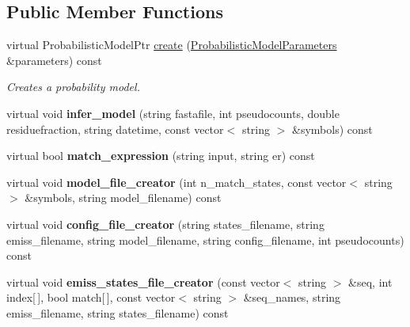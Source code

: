 \subsection*{Public Member Functions}
\begin{DoxyCompactItemize}
\item 
virtual Probabilistic\+Model\+Ptr \hyperlink{classtops_1_1TrainProfileHMMMaxLikelihood_ad73c7f1ec96af19a08186cfec7a141e7}{create} (\hyperlink{classtops_1_1ProbabilisticModelParameters}{Probabilistic\+Model\+Parameters} \&parameters) const
\begin{DoxyCompactList}\small\item\em Creates a probability model. \end{DoxyCompactList}\item 
\mbox{\label{classtops_1_1TrainProfileHMMMaxLikelihood_a00146cd905b59b1a260227dfaf64829f}} 
virtual void {\bfseries infer\+\_\+model} (string fastafile, int pseudocounts, double residuefraction, string datetime, const vector$<$ string $>$ \&symbols) const
\item 
\mbox{\label{classtops_1_1TrainProfileHMMMaxLikelihood_a058fd6f201c3f64db3385b591b1b21e7}} 
virtual bool {\bfseries match\+\_\+expression} (string input, string er) const
\item 
\mbox{\label{classtops_1_1TrainProfileHMMMaxLikelihood_a9c0828cf670b48f74343bf1850b8414b}} 
virtual void {\bfseries model\+\_\+file\+\_\+creator} (int n\+\_\+match\+\_\+states, const vector$<$ string $>$ \&symbols, string model\+\_\+filename) const
\item 
\mbox{\label{classtops_1_1TrainProfileHMMMaxLikelihood_a94dbb667d355c3e7a5d84dfe4ae5dd83}} 
virtual void {\bfseries config\+\_\+file\+\_\+creator} (string states\+\_\+filename, string emiss\+\_\+filename, string model\+\_\+filename, string config\+\_\+filename, int pseudocounts) const
\item 
\mbox{\label{classtops_1_1TrainProfileHMMMaxLikelihood_a3f3f85e3d6234eb962654e91953c8e94}} 
virtual void {\bfseries emiss\+\_\+states\+\_\+file\+\_\+creator} (const vector$<$ string $>$ \&seq, int index\mbox{[}$\,$\mbox{]}, bool match\mbox{[}$\,$\mbox{]}, const vector$<$ string $>$ \&seq\+\_\+names, string emiss\+\_\+filename, string states\+\_\+filename) const

\end{DoxyCompactItemize}
